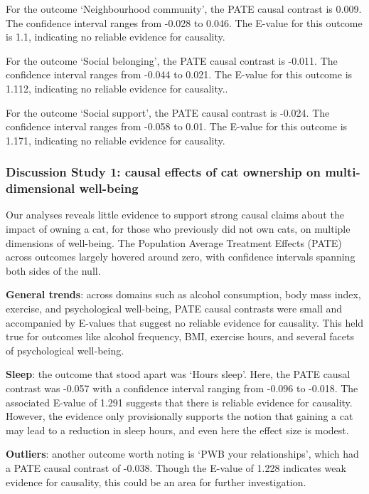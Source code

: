 \documentclass[
  singlecolumn,
  9pt]{article}
\begin{document}
For the outcome `Neighbourhood community', the PATE causal contrast is
0.009. The confidence interval ranges from -0.028 to 0.046. The E-value
for this outcome is 1.1, indicating no reliable evidence for causality.

For the outcome `Social belonging', the PATE causal contrast is -0.011.
The confidence interval ranges from -0.044 to 0.021. The E-value for
this outcome is 1.112, indicating no reliable evidence for causality..

For the outcome `Social support', the PATE causal contrast is -0.024.
The confidence interval ranges from -0.058 to 0.01. The E-value for this
outcome is 1.171, indicating no reliable evidence for causality.

\subsubsection{Discussion Study 1: causal effects of cat ownership on
multi-dimensional
well-being}\label{discussion-study-1-causal-effects-of-cat-ownership-on-multi-dimensional-well-being}

Our analyses reveals little evidence to support strong causal claims
about the impact of owning a cat, for those who previously did not own
cats, on multiple dimensions of well-being. The Population Average
Treatment Effects (PATE) across outcomes largely hovered around zero,
with confidence intervals spanning both sides of the null.

\textbf{General trends}: across domains such as alcohol consumption,
body mass index, exercise, and psychological well-being, PATE causal
contrasts were small and accompanied by E-values that suggest no
reliable evidence for causality. This held true for outcomes like
alcohol frequency, BMI, exercise hours, and several facets of
psychological well-being.

\textbf{Sleep}: the outcome that stood apart was `Hours sleep'. Here,
the PATE causal contrast was -0.057 with a confidence interval ranging
from -0.096 to -0.018. The associated E-value of 1.291 suggests that
there is reliable evidence for causality. However, the evidence only
provisionally supports the notion that gaining a cat may lead to a
reduction in sleep hours, and even here the effect size is modest.

\textbf{Outliers}: another outcome worth noting is `PWB your
relationships', which had a PATE causal contrast of -0.038. Though the
E-value of 1.228 indicates weak evidence for causality, this could be an
area for further investigation.
\end{document}
